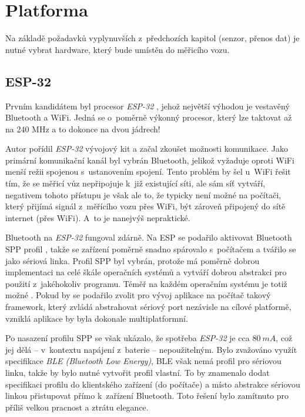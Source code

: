 \section{Platforma}
\label{sec:wsm-platforma}

Na základě požadavků vyplynuvších z~předchozích kapitol (senzor, přenos dat)
je nutné vybrat hardware, který bude umístěn do měřicího vozu.

\subsection{ESP-32}
\label{subsec:wsm-esp32}

Prvním kandidátem byl procesor \textit{ESP-32} \cite{esp-32}, jehož největší
výhodou je vestavěný Bluetooth a WiFi. Jedná se o~poměrně výkonný procesor,
který lze taktovat až na 240 MHz a to dokonce na dvou jádrech!
\cite{esp-32:datasheet}

Autor pořídil \textit{ESP-32} vývojový kit a začal zkoušet možnosti komunikace. Jako
primární komunikační kanál byl vybrán Bluetooth, jelikož vyžaduje oproti WiFi
menší režii spojenou s~ustanovením spojení. Tento problém by šel u~WiFi řešit
tím, že se měřicí vůz nepřipojuje k~již existující síti, ale sám síť vytváří,
negativem tohoto přístupu je však ale to, že typicky není možné na počítači,
který přijímá signál z~měřícího vozu přes WiFi, být zároveň připojený do sítě
internet (přes WiFi). A~to je nanejvýš nepraktické.

Bluetooth na \textit{ESP-32} fungoval zdárně. Na ESP se podařilo aktivovat Bluetooth SPP
profil \cite{spp:specs}, takže se zařízení poměrně snadno spárovalo s~počítačem a
tvářilo se jako sériová linka. Profil SPP byl vybrán, protože má
poměrně dobrou implementaci na celé škále operačních systémů a vytváří dobrou
abstrakci pro použití z~jakéhokoliv programu. Téměř na každém operačním systému
je totiž možné . Pokud by se podařilo zvolit pro
vývoj aplikace na počítač takový framework, který zvládá abstrahovat sériový
port nezávisle na cílové platformě, vzniklá aplikace by byla dokonale
multiplatformní.

Po nasazení profilu SPP se však ukázalo, že spotřeba \textit{ESP-32} je cca $80\ mA$,
což jej dělá -- v~kontextu napájení z~baterie -- nepoužitelným. Bylo zvažováno
využít specifikace \textit{BLE (Bluetooth Low Energy)}, BLE však nemá
profil pro sériovou linku, takže by bylo nutné vytvořit profil vlastní. To
by znamenalo dodat specifikaci profilu do klientského zařízení (do počítače)
a místo abstrakce sériovou linkou přistupovat přímo k~zařízení Bluetooth.
Toto řešení bylo zamítnuto pro příliš velkou pracnost a ztrátu elegance.

